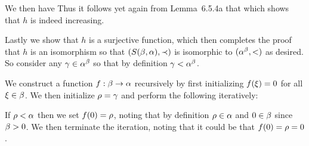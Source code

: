 \begin{solution}
    We then have
    Thus it follows yet again from Lemma~6.5.4a that
    which shows that $h$ is indeed increasing.

    Lastly we show that $h$ is a surjective function, which then completes the proof that $h$ is an isomorphism so that $(S(\beta,\alpha), \prec)$ is isomorphic to $(\alpha^\beta, <)$ as desired.
    So consider any $\gamma \in \alpha^\beta$ so that by definition $\gamma < \alpha^\beta$.
    
    We construct a function $f: \beta \to \alpha$ recursively by first initializing $f(\xi) = 0$ for all $\xi \in \beta$.
    We then initialize $\rho = \gamma$ and perform the following iteratively:

    If $\rho < \alpha$ then we set $f(0) = \rho$, noting that by definition $\rho \in \alpha$ and $0 \in \beta$ since $\beta > 0$.
    We then terminate the iteration, noting that it could be that $f(0) = \rho = 0$. 


\end{solution}
